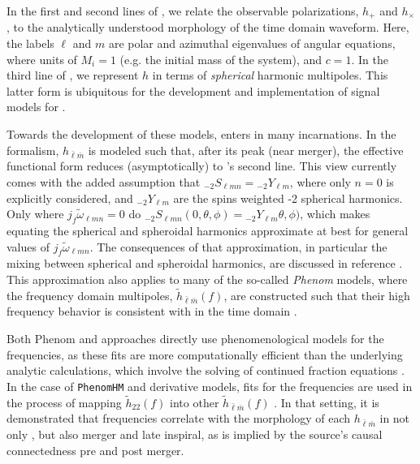 \documentclass[twocolumn,aps,prd,floatfix,preprintnumbers,a4paper,nofootinbib,
superscriptaddress,10pt]{revtex4-1}
\newcommand{\cw}{\tilde{\omega}}
\def\jf{j_f}
\def\lmn{_{\ell m n}}
\def\LM{_{\bar{\ell} \bar{m}}}
\begin{document}
%
\par In the first and second lines of , we relate the observable \gw{} polarizations, $h_+$ and $h_\times$, to the analytically understood morphology of the time domain \rd{} waveform.
%
Here, the labels $\ell$ and $m$ are polar and azimuthal eigenvalues of  angular equations, where units of $M_i=1$ (e.g. the initial mass of the \bbh{} system), and $c=1$.
%
In the third line of , we represent $h$ in terms of \textit{spherical} harmonic multipoles.
%
This latter form is ubiquitous for the development and implementation of \imr{} signal models for .
%
%
\par Towards the development of these models,  enters in many incarnations.
%
In the \eob{} formalism, $h\LM$ is modeled such that, after its peak (near merger), the effective functional form reduces (asymptotically) to 's second line.
%
This view currently comes with the added assumption that ${_{-2}}S_{\ell m n} = {_{-2}}Y_{\ell m}$, where only $n=0$ is explicitly considered, and ${_{-2}}Y_{\ell m}$ are the spins weighted -2 spherical harmonics.
%
Only where $\jf \cw\lmn=0$ do $_{-2}S\lmn( 0,\theta,\phi) = {_{-2}}Y_{\ell m}\theta,\phi)$, which makes equating the spherical and spheroidal harmonics approximate at best for general values of $\jf \cw\lmn$.
%
The consequences of that approximation, in particular the mixing between spherical and spheroidal harmonics, are discussed in reference \cite{London:2014cma,Berti:2014fga,London:2018gaq}.
%
This approximation also applies to many of the so-called \textit{Phenom} models, where the frequency domain multipoles, $\tilde{h}\LM(f)$, are constructed such that their high frequency behavior is consistent with  in the time domain \cite{Hannam:2013oca,London:2017bcn,Khan:2015jqa,Schmidt:2014iyl}.
%
\par Both Phenom and \eob{} approaches directly use phenomenological models for the \qnm{} frequencies, as these fits are more computationally efficient than the underlying analytic calculations, which involve the solving of continued fraction equations \cite{Leaver85}.
%
In the case of \texttt{PhenomHM} and derivative models, fits for the \qnm{} frequencies are used in the process of mapping $\tilde{h}_{22}(f)$ into other $\tilde{h}\LM(f)$ \cite{London:2017bcn}.
%
In that setting, it is demonstrated that \qnm{} frequencies correlate with the morphology of each $h\LM$ in not only \rd{}, but also merger and late inspiral, as is implied by the source's causal connectedness pre and post merger.
%
\end{document}
